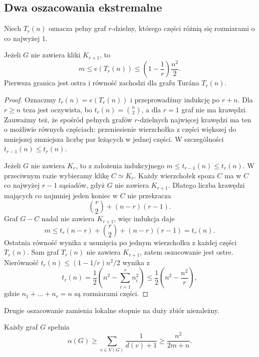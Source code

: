 \documentclass{lecture-kuznia}
\newenvironment{theoryproof}{\begin{proof}}{\end{proof}}
\begin{document}
\subsection{Dwa oszacowania ekstremalne}

Niech $T_r(n)$ oznacza pełny graf $r$-dzielny, którego części różnią się
rozmiarami o co najwyżej $1$.

\begin{theorem}[Turán]
	Jeżeli $G$ nie zawiera kliki $K_{r+1}$, to
	\[
		m\leqslant e(T_r(n))
		\leqslant\left(1-\frac1r\right)\frac{n^2}{2}.
	\]
	Pierwsza granica jest ostra i równość zachodzi dla grafu Turána $T_r(n)$.
\end{theorem}

\begin{theoryproof}
	Oznaczmy $t_r(n)=e(T_r(n))$ i przeprowadźmy indukcję po $r+n$. Dla
	$r\geqslant n$ teza jest oczywista, bo $t_r(n)=\binom n2$, a dla $r=1$
	graf nie ma krawędzi. Zauważmy też, że spośród pełnych grafów $r$-dzielnych
	najwięcej krawędzi ma ten o możliwie równych częściach: przeniesienie
	wierzchołka z części większej do mniejszej zmniejsza liczbę par leżących w
	jednej części. W szczególności $t_{r-1}(n)\leqslant t_r(n)$.

	Jeżeli $G$ nie zawiera $K_r$, to z założenia indukcyjnego
	$m\leqslant t_{r-1}(n)\leqslant t_r(n)$. W przeciwnym razie wybieramy klikę
	$C\simeq K_r$. Każdy wierzchołek spoza $C$ ma w $C$ co najwyżej $r-1$
	sąsiadów, gdyż $G$ nie zawiera $K_{r+1}$. Dlatego liczba krawędzi mających
	co najmniej jeden koniec w $C$ nie przekracza
	\[
		\binom r2+(n-r)(r-1).
	\]
	Graf $G-C$ nadal nie zawiera $K_{r+1}$, więc indukcja daje
	\[
		m\leqslant t_r(n-r)+\binom r2+(n-r)(r-1)=t_r(n).
	\]
	Ostatnia równość wynika z usunięcia po jednym wierzchołku z każdej części
	$T_r(n)$. Sam graf $T_r(n)$ nie zawiera $K_{r+1}$, zatem oszacowanie jest
	ostre. Nierówność
	$t_r(n)\leqslant(1-1/r)n^2/2$ wynika z
	\[
		t_r(n)=\frac12\left(n^2-\sum_{i=1}^r n_i^2\right)
		\leqslant\frac12\left(n^2-\frac{n^2}{r}\right),
	\]
	gdzie $n_1+\dots+n_r=n$ są rozmiarami części.
\end{theoryproof}

Drugie oszacowanie zamienia lokalne stopnie na duży zbiór niezależny.

\begin{theorem}
	Każdy graf $G$ spełnia
	\[
		\alpha(G)\geqslant
		\sum_{v\in V(G)}\frac1{d(v)+1}
		\geqslant\frac{n^2}{2m+n}.
	\]
\end{theorem}
\end{document}
